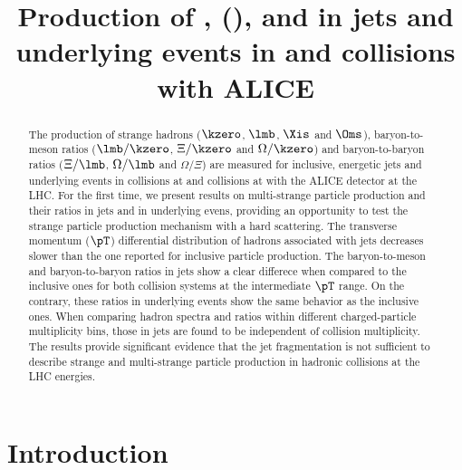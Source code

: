 \documentclass[ALICE,manyauthors]{cernphprep}
\begin{document}
\begin{titlepage}

\title{Production of \kzero, \lmb (\almb), \Xis and \Oms in jets and underlying events in \pp and \pPb collisions with ALICE}


\begin{abstract}
\label{sec:Abs}

The production of strange hadrons ($\kzero$, $\lmb$, $\Xis$ and $\Oms$), baryon-to-meson ratios ($\lmb/\kzero$, $\Xi/\kzero$ and $\Omega/\kzero$) and baryon-to-baryon ratios ($\Xi/\lmb$, $\Omega/\lmb$ and $\Omega/\Xi$) are measured for inclusive, energetic jets and underlying events in \pp collisions at \thirteen and \pPb collisions at \fivenn with the ALICE detector at the LHC.
For the first time, we present results on multi-strange particle production and their ratios in jets and in underlying evens, providing an opportunity to test the strange particle production mechanism with a hard scattering.
The transverse momentum ($\pT$) differential distribution of hadrons associated with jets decreases slower than the one reported for inclusive particle production.
The baryon-to-meson and baryon-to-baryon ratios in jets show a clear differece when compared to the inclusive ones for both collision systems at the intermediate $\pT$ range.
On the contrary, these ratios in underlying events show the same behavior as the inclusive ones.
When comparing hadron spectra and ratios within different charged-particle multiplicity bins, those in jets are found to be independent of collision multiplicity.
The results provide significant evidence that the jet fragmentation is not sufficient to describe strange and multi-strange particle production in hadronic collisions at the LHC energies. 


\end{abstract}

\end{titlepage}

\setcounter{page}{2}


\section{Introduction}%
\label{sec:Introduction}
\end{document}
